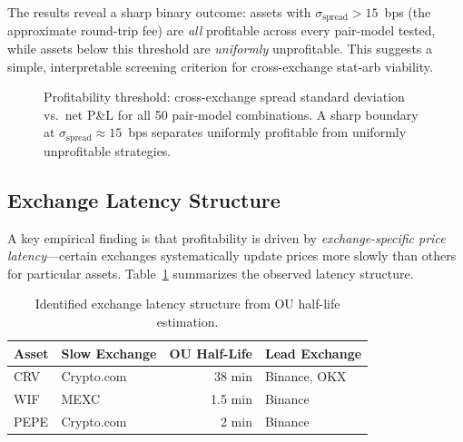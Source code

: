 \documentclass[sigconf,nonacm=false]{acmart}
\begin{document}
The results reveal a sharp binary outcome: assets with $\sigma_{\text{spread}} > 15$~bps (the approximate round-trip fee) are \emph{all} profitable across every pair-model tested, while assets below this threshold are \emph{uniformly} unprofitable. This suggests a simple, interpretable screening criterion for cross-exchange stat-arb viability.

\begin{figure}[h]
\centering
{}
\caption{Profitability threshold: cross-exchange spread standard deviation vs.\ net P\&L for all 50 pair-model combinations. A sharp boundary at $\sigma_{\text{spread}} \approx 15$~bps separates uniformly profitable from uniformly unprofitable strategies.}
\label{fig:threshold}
\end{figure}

\subsection{Exchange Latency Structure}\label{sec:latency}

A key empirical finding is that profitability is driven by \emph{exchange-specific price latency}---certain exchanges systematically update prices more slowly than others for particular assets. Table~\ref{tab:latency} summarizes the observed latency structure.

\begin{table}[h]
\caption{Identified exchange latency structure from OU half-life estimation.}
\label{tab:latency}
\begin{tabular}{llrl}
\toprule
\textbf{Asset} & \textbf{Slow Exchange} & \textbf{OU Half-Life} & \textbf{Lead Exchange} \\
\midrule
CRV  & Crypto.com & 38 min & Binance, OKX \\
WIF  & MEXC       & 1.5 min & Binance \\
PEPE & Crypto.com & 2 min  & Binance \\
\bottomrule
\end{tabular}
\end{table}
\end{document}
